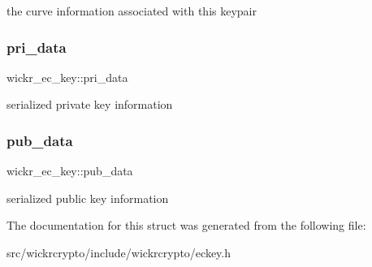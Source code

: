 the curve information associated with this keypair \mbox{\label{structwickr__ec__key_a67c23110b722401c6ba8b883b3aa74fc}} 
\subsubsection{\texorpdfstring{pri\_data}{pri\_data}}
{\footnotesize\ttfamily wickr\+\_\+ec\+\_\+key\+::pri\+\_\+data}

serialized private key information \mbox{\label{structwickr__ec__key_af972d3c8b571df0ef009ebf079705e82}} 
\subsubsection{\texorpdfstring{pub\_data}{pub\_data}}
{\footnotesize\ttfamily wickr\+\_\+ec\+\_\+key\+::pub\+\_\+data}

serialized public key information 

The documentation for this struct was generated from the following file\+:\begin{DoxyCompactItemize}
\item 
src/wickrcrypto/include/wickrcrypto/eckey.\+h\end{DoxyCompactItemize}
